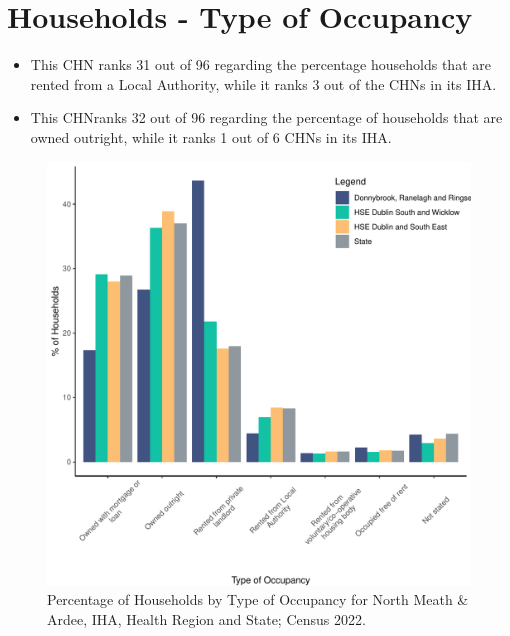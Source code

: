 \documentclass{article}
\begin{document}
\section{Households - Type of Occupancy}\label{sect:Households}
\begin{itemize}
\item This CHN ranks  31 out of 96 regarding the percentage households that are rented from a Local Authority, while it ranks  3 out of the CHNs in its IHA. 
\item This CHNranks  32 out of 96 regarding the percentage of households that are owned outright, while it ranks   1 out of 6 CHNs in its IHA.
\end{itemize}
\begin{figure}[H]
	\centering
	\includegraphics[width = 140mm]{../figures/HouseholdsED.pdf}
	\caption{Percentage of Households by Type of Occupancy for North Meath & Ardee, IHA, Health Region and State; Census 2022.}
	\label{fig:vbnv}
	\end{figure}
\end{document}
